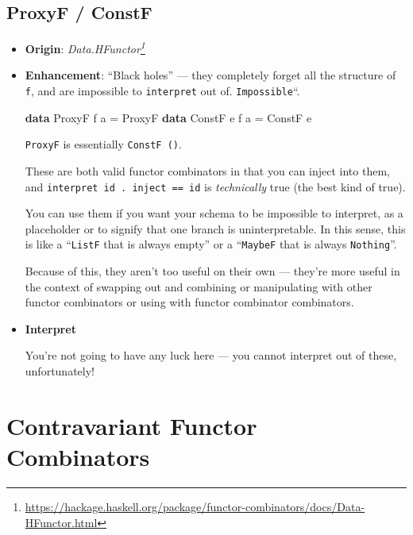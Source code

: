 \documentclass[]{article}
\newenvironment{Shaded}{}{}
\newcommand{\DataTypeTok}[1]{\textcolor[rgb]{0.56,0.13,0.00}{#1}}
\newcommand{\KeywordTok}[1]{\textcolor[rgb]{0.00,0.44,0.13}{\textbf{#1}}}
\newcommand{\NormalTok}[1]{#1}
\newcommand{\OtherTok}[1]{\textcolor[rgb]{0.00,0.44,0.13}{#1}}
\renewcommand{\href}[2]{#2\footnote{\url{#1}}}
\begin{document}
\subsection{ProxyF / ConstF}\label{proxyf-constf}

\begin{itemize}
\item
  \textbf{Origin}:
  \emph{\href{https://hackage.haskell.org/package/functor-combinators/docs/Data-HFunctor.html}{Data.HFunctor}}
\item
  \textbf{Enhancement}: ``Black holes'' --- they completely forget all the
  structure of \texttt{f}, and are impossible to \texttt{interpret} out of.
  \texttt{Impossible}``.

\begin{Shaded}
\begin{Highlighting}[]
\KeywordTok{data} \DataTypeTok{ProxyF}\NormalTok{ f a }\OtherTok{=} \DataTypeTok{ProxyF}
\KeywordTok{data} \DataTypeTok{ConstF}\NormalTok{ e f a }\OtherTok{=} \DataTypeTok{ConstF}\NormalTok{ e}
\end{Highlighting}
\end{Shaded}

  \texttt{ProxyF} is essentially \texttt{ConstF\ ()}.

  These are both valid functor combinators in that you can inject into them, and
  \texttt{interpret\ id\ .\ inject\ ==\ id} is \emph{technically} true (the best
  kind of true).

  You can use them if you want your schema to be impossible to interpret, as a
  placeholder or to signify that one branch is uninterpretable. In this sense,
  this is like a ``\texttt{ListF} that is always empty'' or a ``\texttt{MaybeF}
  that is always \texttt{Nothing}''.

  Because of this, they aren't too useful on their own --- they're more useful
  in the context of swapping out and combining or manipulating with other
  functor combinators or using with functor combinator combinators.
\item
  \textbf{Interpret}

  You're not going to have any luck here --- you cannot interpret out of these,
  unfortunately!
\end{itemize}

\section{Contravariant Functor
Combinators}\label{contravariant-functor-combinators}
\end{document}
